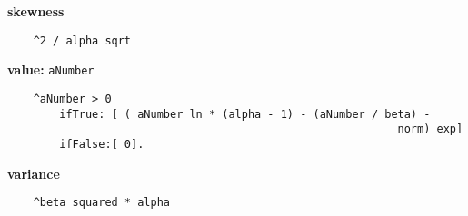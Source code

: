{\bf skewness}
\begin{verbatim}
    ^2 / alpha sqrt

\end{verbatim}
{\bf value:} {\tt aNumber}
\begin{verbatim}
    ^aNumber > 0
        ifTrue: [ ( aNumber ln * (alpha - 1) - (aNumber / beta) - 
                                                            norm) exp]
        ifFalse:[ 0].

\end{verbatim}
{\bf variance}
\begin{verbatim}
    ^beta squared * alpha

\end{verbatim}

